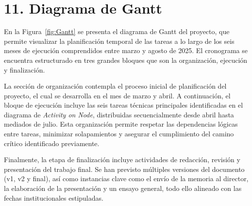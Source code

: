 \documentclass[
11pt, %
]{charter}
\begin{document}
\pagebreak


\section{11. Diagrama de Gantt}
\label{sec:gantt}

En la Figura~\ref{fig:Gantt} se presenta el diagrama de Gantt del proyecto, que permite visualizar la planificación temporal de las tareas a lo largo de los seis meses de ejecución comprendidos entre marzo y agosto de 2025. El cronograma se encuentra estructurado en tres grandes bloques que son la organización, ejecución y finalización.

La sección de organización contempla el proceso inicial de planificación del proyecto, el cual se desarrolla en el mes de marzo y abril. A continuación, el bloque de ejecución incluye las seis tareas técnicas principales identificadas en el diagrama de \textit{Activity on Node}, distribuidas secuencialmente desde abril hasta mediados de julio. Esta organización permite respetar las dependencias lógicas entre tareas, minimizar solapamientos y asegurar el cumplimiento del camino crítico identificado previamente.

Finalmente, la etapa de finalización incluye actividades de redacción, revisión y presentación del trabajo final. Se han previsto múltiples versiones del documento (v1, v2 y final), así como instancias clave como el envío de la memoria al director, la elaboración de la presentación y un ensayo general, todo ello alineado con las fechas institucionales estipuladas.
\end{document}
